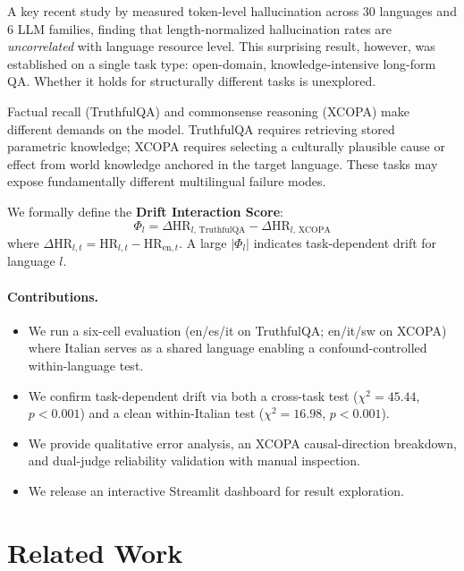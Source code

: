 \documentclass[11pt]{article}
\begin{document}
A key recent study by \citet{ulislam-etal-2025-hallucinate} measured
token-level hallucination across 30 languages and 6 LLM families, finding that
length-normalized hallucination rates are \emph{uncorrelated} with language
resource level. This surprising result, however, was established on a single
task type: open-domain, knowledge-intensive long-form QA. Whether it holds for
structurally different tasks is unexplored.

Factual recall (TruthfulQA) and commonsense reasoning (XCOPA) make different
demands on the model. TruthfulQA requires retrieving stored parametric
knowledge; XCOPA requires selecting a culturally plausible cause or effect from
world knowledge anchored in the target language. These tasks may expose
fundamentally different multilingual failure modes.

We formally define the \textbf{Drift Interaction Score}:
\[
\Phi_l = \Delta\mathrm{HR}_{l,\,\text{TruthfulQA}}
       - \Delta\mathrm{HR}_{l,\,\text{XCOPA}}
\]
where $\Delta\mathrm{HR}_{l,t} = \mathrm{HR}_{l,t} - \mathrm{HR}_{\mathrm{en},t}$.
A large $|\Phi_l|$ indicates task-dependent drift for language $l$.

\paragraph{Contributions.}
\begin{itemize}
  \item We run a six-cell evaluation (en/es/it on TruthfulQA; en/it/sw on XCOPA)
        where Italian serves as a shared language enabling a confound-controlled
        within-language test.
  \item We confirm task-dependent drift via both a cross-task test
        ($\chi^2=45.44$, $p<0.001$) and a clean within-Italian test
        ($\chi^2=16.98$, $p<0.001$).
  \item We provide qualitative error analysis, an XCOPA causal-direction
        breakdown, and dual-judge reliability validation with manual inspection.
  \item We release an interactive Streamlit dashboard for result exploration.
\end{itemize}

\section{Related Work}
\end{document}
